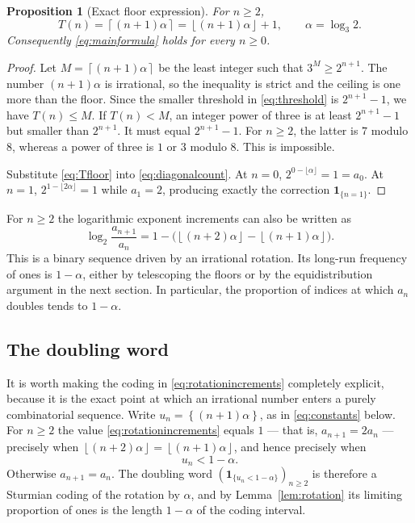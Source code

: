 \documentclass[11pt,letterpaper]{article}
\numberwithin{equation}{section}
\newtheorem{proposition}[theorem]{Proposition}
\theoremstyle{definition}
\theoremstyle{remark}
\newcommand{\ind}[1]{\boldsymbol{1}_{\{#1\}}}
\newcommand{\fracpart}[1]{\left\{#1\right\}}
\newcommand{\floor}[1]{\left\lfloor#1\right\rfloor}
\newcommand{\ceil}[1]{\left\lceil#1\right\rceil}
\begin{document}
\begin{proposition}[Exact floor expression]\label{prop:floor}
For $n\ge2$,
\begin{equation}\label{eq:Tfloor}
 T(n)=\ceil{(n+1)\alpha}=\floor{(n+1)\alpha}+1,
 \qquad \alpha=\log_3 2.
\end{equation}
Consequently \eqref{eq:mainformula} holds for every $n\ge0$.
\end{proposition}
\begin{proof}
Let $M=\ceil{(n+1)\alpha}$ be the least integer such that
$3^M\ge2^{n+1}$. The number $(n+1)\alpha$ is irrational, so the inequality
is strict and the ceiling is one more than the floor.
Since the smaller threshold in \eqref{eq:threshold} is $2^{n+1}-1$,
we have $T(n)\le M$. If $T(n)<M$, an integer power of three is at least
$2^{n+1}-1$ but smaller than $2^{n+1}$. It must equal $2^{n+1}-1$.
For $n\ge2$, the latter is $7$ modulo $8$, whereas a power of three is
$1$ or $3$ modulo $8$. This is impossible.

Substitute \eqref{eq:Tfloor} into \eqref{eq:diagonalcount}. At $n=0$,
$2^{0-\lfloor\alpha\rfloor}=1=a_0$. At $n=1$,
$2^{1-\lfloor2\alpha\rfloor}=1$ while $a_1=2$, producing exactly the
correction $\ind{n=1}$.
\end{proof}

For $n\ge2$ the logarithmic exponent increments can also be written as
\begin{equation}\label{eq:rotationincrements}
 \log_2\frac{a_{n+1}}{a_n}
 =1-\bigl(\floor{(n+2)\alpha}-\floor{(n+1)\alpha}\bigr).
\end{equation}
This is a binary sequence driven by an irrational rotation. Its long-run
frequency of ones is $1-\alpha$, either by telescoping the floors or by
the equidistribution argument in the next section. In particular, the
proportion of indices at which $a_n$ doubles tends to $1-\alpha$.

\subsection{The doubling word}\label{sec:doublingword}
It is worth making the coding in \eqref{eq:rotationincrements} completely
explicit, because it is the exact point at which an irrational number enters
a purely combinatorial sequence. Write $u_n=\fracpart{(n+1)\alpha}$, as in
\eqref{eq:constants} below. For $n\ge2$ the value \eqref{eq:rotationincrements}
equals $1$ --- that is, $a_{n+1}=2a_n$ --- precisely when
$\floor{(n+2)\alpha}=\floor{(n+1)\alpha}$, and hence precisely when
\begin{equation}\label{eq:sturmian}
 u_n<1-\alpha.
\end{equation}
Otherwise $a_{n+1}=a_n$. The doubling word
$(\ind{u_n<1-\alpha})_{n\ge2}$ is therefore a Sturmian coding of the
rotation by $\alpha$, and by Lemma~\ref{lem:rotation} its limiting
proportion of ones is the length $1-\alpha$ of the coding interval.
\end{document}

